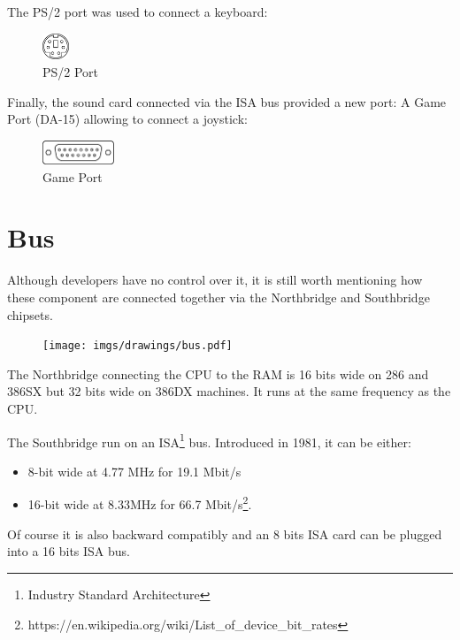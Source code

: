 \documentclass[book.tex]{subfiles}
\begin{document}
The PS/2 port was used to connect a keyboard:
 \begin{figure}[H]
\centering
\includegraphics[width=0.07\textwidth]{imgs/drawings/ports/MiniDIN-6_PS2.eps}
\caption{PS/2 Port}
\label{fig:ps2Port}
\end{figure}


Finally, the sound card connected via the ISA bus provided a new port: A Game Port (DA-15) allowing to connect a joystick:
 \begin{figure}[H]
\centering
\includegraphics[width=0.19\textwidth]{imgs/drawings/ports/DA-15_GamePort.eps}
\caption{Game Port}
\label{fig:gamePort}
\end{figure}


\section{Bus}
Although developers have no control over it, it is still worth mentioning how these component are connected together via the Northbridge and Southbridge chipsets.\\ 
\par
\begin{figure}[H]
\centering
      \texttt{[image: imgs/drawings/bus.pdf]}
\end{figure}
\par
The Northbridge connecting the CPU to the RAM is 16 bits wide on 286 and 386SX but 32 bits wide on 386DX machines. It runs at the same frequency as the CPU.\\
\par
The Southbridge run on an ISA\footnote{Industry Standard Architecture} bus. Introduced in 1981, it can be either:
\begin{itemize}
\item 8-bit wide at 4.77 MHz  for 19.1 Mbit/s
\item 16-bit wide at 8.33MHz for 66.7 Mbit/s\footnote{https://en.wikipedia.org/wiki/List\_of\_device\_bit\_rates}.
\end{itemize}
Of course it is also backward compatibly and an 8 bits ISA card can be plugged into a 16 bits ISA bus.\\
\par
\end{document}
